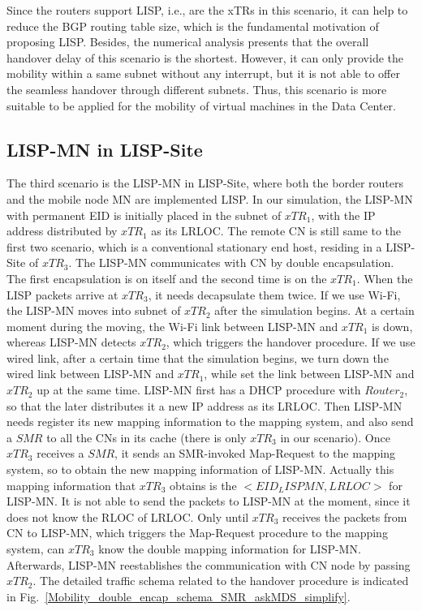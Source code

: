 Since the routers support LISP, i.e., are the xTRs in this scenario, it can help to reduce the BGP routing table size, which is the fundamental motivation of proposing LISP. Besides, the numerical analysis presents that the overall handover delay of this scenario is the shortest. However, it can only provide the mobility within a same subnet without any interrupt, but it is not able to offer the seamless handover through different subnets. Thus, this scenario is more suitable to be applied for the mobility of virtual machines in the Data Center.

\subsection{LISP-MN in LISP-Site}
\label{sec:ns3_analysis_lispmn_xTR}
The third scenario is the LISP-MN in LISP-Site, where both the border routers and the mobile node MN are implemented LISP. In our simulation, the LISP-MN with permanent EID is initially placed in the subnet of $xTR_1$, with the IP address distributed by $xTR_1$ as its LRLOC. The remote CN is still same to the first two scenario, which is a conventional stationary end host, residing in a LISP-Site of $xTR_3$. The LISP-MN communicates with CN by double encapsulation. The first encapsulation is on itself and the second time is on the $xTR_1$. When the LISP packets arrive at $xTR_3$, it needs decapsulate them twice. If we use Wi-Fi, the LISP-MN moves into subnet of $xTR_2$ after the simulation begins. At a certain moment during the moving, the Wi-Fi link between LISP-MN and $xTR_1$ is down, whereas LISP-MN detects $xTR_2$, which triggers the handover procedure. If we use wired link, after a certain time that the simulation begins, we turn down the wired link between LISP-MN and $xTR_1$, while set the link between LISP-MN and $xTR_2$ up at the same time. LISP-MN first has a DHCP procedure with $Router_2$, so that the later distributes it a new IP address as its LRLOC. Then LISP-MN needs register its new mapping information to the mapping system, and also send a $SMR$ to all the CNs in its cache (there is only $xTR_3$ in our scenario). Once $xTR_3$ receives a $SMR$, it sends an SMR-invoked Map-Request to the mapping system, so to obtain the new mapping information of LISP-MN. Actually this mapping information that $xTR_3$ obtains is the $<EID_LISPMN, LRLOC>$ for LISP-MN. It is not able to send the packets to LISP-MN at the moment, since it does not know the RLOC of LRLOC. Only until $xTR_3$ receives the packets from CN to LISP-MN, which triggers the Map-Request procedure to the mapping system, can $xTR_3$ know the double mapping information for LISP-MN. Afterwards, LISP-MN reestablishes the communication with CN node by passing $xTR_2$. The detailed traffic schema related to the handover procedure is indicated in Fig.~\ref{Mobility_double_encap_schema_SMR_askMDS_simplify}.
